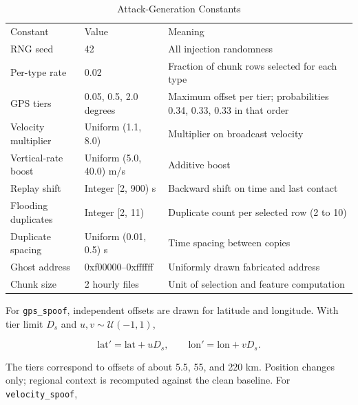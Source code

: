 \documentclass[conference]{IEEEtran}
\newcommand{\gps}{\texttt{gps\_spoof}}
\newcommand{\vel}{\texttt{velocity\_spoof}}
\begin{document}
\begin{table}[t]\caption{Attack-Generation Constants}\label{tab:constants}\centering\footnotesize

\begin{tabularx}{\textwidth}{l l X}\toprule Constant & Value & Meaning \\

RNG seed & 42 & All injection randomness \\

Per-type rate & 0.02 & Fraction of chunk rows selected for each type \\

GPS tiers & 0.05, 0.5, 2.0 degrees & Maximum offset per tier; probabilities 0.34, 0.33, 0.33 in that order \\

Velocity multiplier & Uniform (1.1, 8.0) & Multiplier on broadcast velocity \\

Vertical-rate boost & Uniform (5.0, 40.0) m/s & Additive boost \\

Replay shift & Integer [2, 900) s & Backward shift on time and last contact \\

Flooding duplicates & Integer [2, 11) & Duplicate count per selected row (2 to 10) \\

Duplicate spacing & Uniform (0.01, 0.5) s & Time spacing between copies \\

Ghost address & 0xf00000--0xffffff & Uniformly drawn fabricated address \\

Chunk size & 2 hourly files & Unit of selection and feature computation \\

\bottomrule\end{tabularx}\end{table}



For \gps, independent offsets are drawn for latitude and longitude. With tier limit $D_s$ and $u,v\sim\mathcal{U}(-1,1)$,

\begin{equation}\mathrm{lat}'=\mathrm{lat}+uD_s,\qquad \mathrm{lon}'=\mathrm{lon}+vD_s.\end{equation}

The tiers correspond to offsets of about 5.5, 55, and 220 km. Position changes only; regional context is recomputed against the clean baseline. For \vel,
\end{document}
